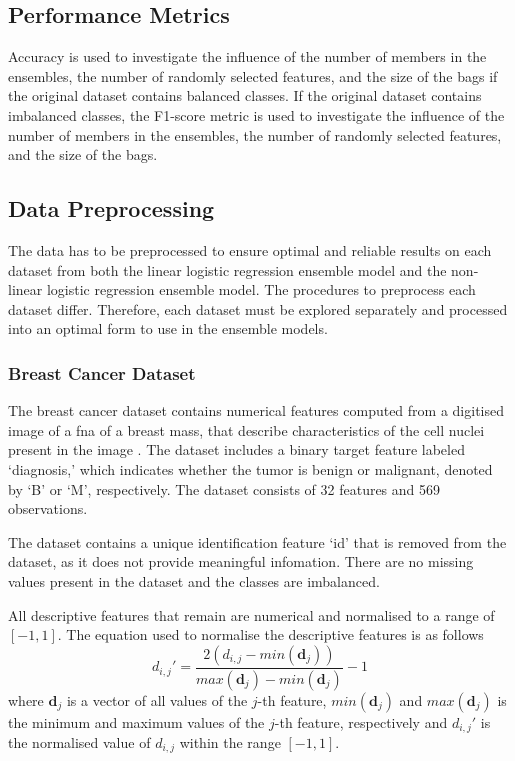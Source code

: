 \documentclass[10pt, conference]{IEEEtran}
\begin{document}
\subsection{Performance Metrics}

Accuracy is used to investigate the influence of the number of members in the
ensembles, the number of randomly selected features, and the size of the bags if the
original dataset contains balanced classes. If the original dataset contains imbalanced
classes, the F1-score metric is used to investigate the influence of the number of members in the
ensembles, the number of randomly selected features, and the size of the bags.

\subsection{Data Preprocessing}

The data has to be preprocessed to ensure optimal and reliable results on each dataset from both the linear
logistic regression ensemble model and the non-linear logistic regression ensemble model.
The procedures to preprocess each dataset differ. Therefore, each dataset must be explored separately and
processed into an optimal form to use in the ensemble models.

\subsubsection{Breast Cancer Dataset}

The breast cancer dataset contains numerical features computed from a digitised image
of a \acrfull{fna} of a breast mass, that describe characteristics of the cell nuclei present in the image \cite{Breast_cancer_ref}.
The dataset includes a binary target feature labeled `diagnosis,' which indicates whether the tumor is
benign or malignant, denoted by `B' or `M', respectively. The dataset consists of 32 features
and 569 observations.

The dataset contains a unique identification feature `id' that is removed from the dataset, as it does not provide
meaningful infomation. There are no missing values present in the dataset and the classes are imbalanced.

All descriptive features that remain are numerical and normalised to a range of $[-1,1]$. The equation used to
normalise the descriptive features is as follows
\begin{equation}
    d_{i,j}' = \frac{2\left(d_{i,j} - min(\textbf{d}_j)\right)}{max(\textbf{d}_j) - min(\textbf{d}_j)} - 1 \label{eq: normalisation}
\end{equation}
where $\textbf{d}_j$ is a vector of all values of the $j$-th feature, $min(\textbf{d}_j)$ and $max(\textbf{d}_j)$
is the minimum and maximum values of the $j$-th feature, respectively and $d_{i,j}'$ is the normalised value
of $d_{i,j}$ within the range $[-1,1]$.
\end{document}
